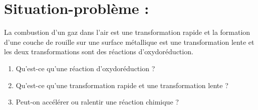 \documentclass[12pt]{article}
\begin{document}
\section*{Situation-problème :}
La combustion d’un gaz dans l’air est une transformation rapide et la formation d’une
couche de rouille sur une surface métallique est une transformation lente et les deux
transformations sont des réactions d’oxydoréduction.

\begin{enumerate}
	\item Qu’est-ce qu’une réaction d’oxydoréduction ?
	\item Qu’est-ce qu’une transformation rapide et une transformation lente ?
	\item Peut-on accélérer ou ralentir une réaction chimique ?

\end{enumerate}
\end{document}
